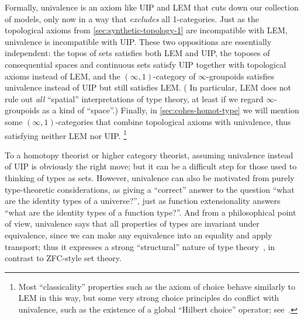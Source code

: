 \documentclass[10pt]{article}
\def\oo{\ensuremath{\infty}}
\def\io{\ensuremath{(\oo,1)}}
\numberwithin{equation}{section}
\begin{document}
Formally, univalence is an axiom like UIP and LEM that cuts down our collection of models, only now in a way that \emph{excludes} all 1-categories.
Just as the topological axioms from \cref{sec:synthetic-topology-1} are incompatible with LEM, univalence is incompatible with UIP.
These two oppositions are essentially independent: the topos of sets satisfies both LEM and UIP, the toposes of consequential spaces and continuous sets satisfy UIP together with topological axioms instead of LEM, and the $\io$-category of $\oo$-groupoids satisfies univalence instead of UIP but still satisfies LEM.
(%
In particular, LEM does not rule out \emph{all} ``spatial'' interpretations of type theory, at least if we regard $\oo$-groupoids as a kind of ``space''.)
Finally, in \cref{sec:cohes-homot-type} we will mention some $\io$-categories that combine topological axioms with univalence, thus satisfying neither LEM nor UIP.%
\footnote{\label{fn:globalchoice}Most ``classicality'' properties such as the axiom of choice behave similarly to LEM in this way, but some very strong choice principles do conflict with univalence, such as the existence of a global ``Hilbert choice'' operator; see~\cite[\S3.2 and Exercise 3.11]{hottbook}.}

To a homotopy theorist or higher category theorist, assuming univalence instead of UIP is obviously the right move; but it can be a difficult step for those used to thinking of types as sets.
However, univalence can also be motivated from purely type-theoretic considerations, as giving a ``correct'' answer to the question ``what are the identity types of a universe?'', just as function extensionality answers ``what are the identity types of a function type?''.
And from a philosophical point of view, univalence says that all properties of types are invariant under equivalence, since we can make any equivalence into an equality and apply transport;
thus it expresses a strong ``structural'' nature of type theory~\cite{awodey:struc-invar-ua,corfield:structure-of-a}, in contrast to ZFC-style set theory.
\end{document}
